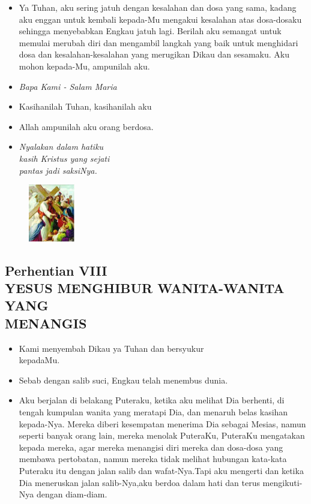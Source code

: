 \documentclass[a5paper,headsepline,titlepage,10pt,nnormalheadings,DIVcalc]{scrbook}
\newcommand{\BU}[1]{\begin{itemize} \item[U:] #1 \end{itemize}}
\newcommand{\BP}[1]{\begin{itemize} \item[P:] #1 \end{itemize}}
\begin{document}
\BU{Ya Tuhan, aku sering  jatuh  dengan  kesalahan dan dosa yang sama, kadang aku enggan untuk kembali kepada-Mu mengakui kesalahan atas dosa-dosaku sehingga menyebabkan Engkau jatuh lagi. Berilah aku semangat untuk memulai merubah diri dan mengambil langkah yang baik untuk menghidari dosa dan kesalahan-kesalahan yang merugikan Dikau dan sesamaku. Aku mohon kepada-Mu, ampunilah aku.}

\large\begin{itemize}\item[~]\it{Bapa Kami - Salam Maria}\end{itemize}\normalsize
\BP{Kasihanilah Tuhan, kasihanilah aku}
   \BU{Allah ampunilah aku orang berdosa.}

\begin{itemize}
\item[7.] \it{Nyalakan dalam hatiku\\ kasih Kristus yang
    sejati\\pantas jadi saksiNya.
}\end{itemize}

\begin{figure}
\includegraphics[width=2cm]{jalansalib_files/08_small.jpg}
\end{figure}
\subsection*{Perhentian VIII\\
YESUS MENGHIBUR WANITA-WANITA YANG\\MENANGIS}
\BP{   Kami menyembah Dikau ya Tuhan dan bersyukur\\kepadaMu.}
\BU{   Sebab dengan salib suci, Engkau telah menembus dunia.}

\BP{Aku  berjalan  di belakang Puteraku,  ketika  aku melihat  Dia berhenti, di tengah kumpulan wanita   yang meratapi Dia, dan menaruh belas kasihan kepada-Nya. Mereka diberi kesempatan menerima Dia sebagai Mesias, namun seperti banyak orang lain, mereka menolak PuteraKu, PuteraKu mengatakan kepada mereka, agar mereka menangisi diri mereka dan dosa-dosa yang membawa pertobatan, namun mereka tidak melihat hubungan kata-kata Puteraku itu dengan jalan salib dan wafat-Nya.Tapi aku mengerti dan ketika Dia meneruskan jalan salib-Nya,aku berdoa dalam hati dan terus mengikuti-Nya dengan diam-diam.}
\end{document}
